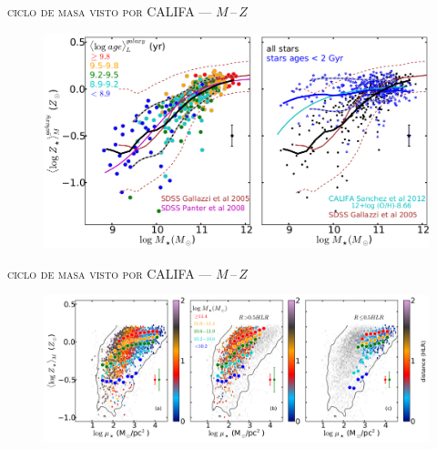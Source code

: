 \documentclass[xcolor=dvipsnames,fleqn,hyperref={colorlinks,citecolor=black,linkcolor=black,urlcolor=black}]{beamer}
\begin{document}
\begin{frame}{\textsc{ciclo de masa visto por CALIFA --- $M\,$--$\,Z$}}

\begin{figure}
\includegraphics[scale=1]{img/gonzalez2014b-1}
\end{figure}
\end{frame}

\begin{frame}{\textsc{ciclo de masa visto por CALIFA --- $M\,$--$\,Z$}}

\begin{figure}
\includegraphics[scale=1]{img/gonzalez2014b-3}
\end{figure}
\end{frame}
\end{document}
